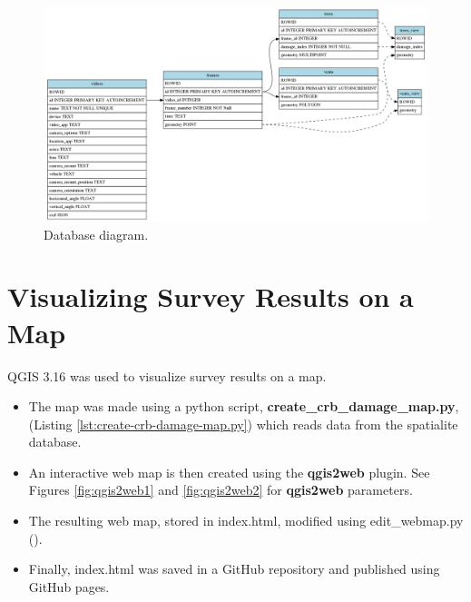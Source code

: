 \documentclass[12pt,letterpaper,english,bibliography=totocnumbered, abstract=on]{scrartcl}
\begin{document}
\begin{figure}[H]
	\centering
	\includegraphics[width=\linewidth]{images/erd.png}
	\caption{Database diagram.}
	\label{fig:erd}
\end{figure}










\section{Visualizing Survey Results on a Map}

QGIS 3.16 was used to visualize survey results on a map. 

\begin{itemize}
	\item The map was made using a python script, 
	\textbf{create\_crb\_damage\_map.py}, 
	(Listing \ref{lst:create-crb-damage-map.py}) which reads data from 
	the spatialite database.
	\item An interactive web map is then created using the \textbf{qgis2web} plugin. 
	See Figures \ref{fig:qgis2web1} and \ref{fig:qgis2web2} for \textbf{qgis2web} parameters.
	\item The resulting	web map, stored in index.html, modified using edit\_webmap.py ().
	\item Finally, index.html was saved in
	a GitHub repository and published using GitHub pages.
\end{itemize}
\end{document}
